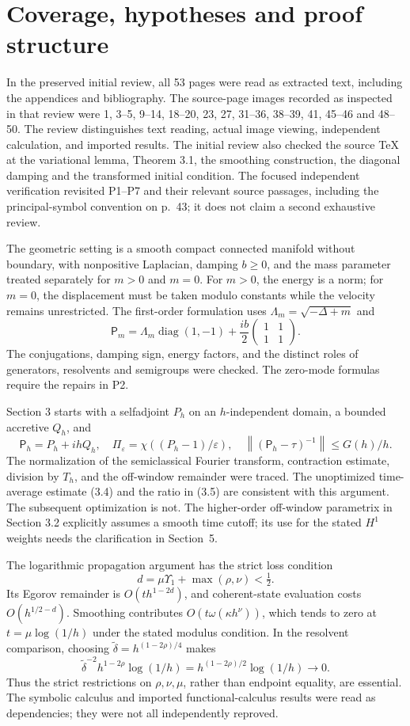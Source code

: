 \documentclass[10pt]{article}
\begin{document}
\section*{Coverage, hypotheses and proof structure}
In the preserved initial review, all 53 pages were read as extracted text, including the appendices and bibliography. The source-page images recorded as inspected in that review were 1, 3–5, 9–14, 18–20, 23, 27, 31–36, 38–39, 41, 45–46 and 48–50. The review distinguishes text reading, actual image viewing, independent calculation, and imported results. The initial review also checked the source TeX at the variational lemma, Theorem 3.1, the smoothing construction, the diagonal damping and the transformed initial condition. The focused independent verification revisited P1–P7 and their relevant source passages, including the principal-symbol convention on p. 43; it does not claim a second exhaustive review.\par
The geometric setting is a smooth compact connected manifold without boundary, with nonpositive Laplacian, damping \(b\geq0\), and the mass parameter treated separately for \(m>0\) and \(m=0\). For \(m>0\), the energy is a norm; for \(m=0\), the displacement must be taken modulo constants while the velocity remains unrestricted. The first-order formulation uses \(\Lambda_m=\sqrt{-\Delta+m}\) and \[\mathsf P_m=\Lambda_m\operatorname{diag}(1,-1)
       +\frac{ib}{2}\begin{pmatrix}1&1\\1&1\end{pmatrix}.\] The conjugations, damping sign, energy factors, and the distinct roles of generators, resolvents and semigroups were checked. The zero-mode formulas require the repairs in P2.\par
Section 3 starts with a selfadjoint \(P_h\) on an \(h\)-independent domain, a bounded accretive \(Q_h\), and \[\mathsf P_h=P_h+ihQ_h,\quad
 \Pi_\varepsilon=\chi((P_h-1)/\varepsilon),\quad
 \left\|(\mathsf P_h-\tau)^{-1}\right\|\leq G(h)/h.\] The normalization of the semiclassical Fourier transform, contraction estimate, division by \(T_h\), and the off-window remainder were traced. The unoptimized time-average estimate (3.4) and the ratio in (3.5) are consistent with this argument. The subsequent optimization is not. The higher-order off-window parametrix in Section 3.2 explicitly assumes a smooth time cutoff; its use for the stated \(H^1\) weights needs the clarification in Section 5.\par
The logarithmic propagation argument has the strict loss condition \[d=\mu\Upsilon_1+\max(\rho,\nu)<\tfrac12.\] Its Egorov remainder is \(O(th^{1-2d})\), and coherent-state evaluation costs \(O(h^{1/2-d})\). Smoothing contributes \(O(t\omega(\kappa h^\nu))\), which tends to zero at \(t=\mu\log(1/h)\) under the stated modulus condition. In the resolvent comparison, choosing \(\widetilde\delta=h^{(1-2\rho)/4}\) makes \[\widetilde\delta^{-2}h^{1-2\rho}\log(1/h)
 =h^{(1-2\rho)/2}\log(1/h)\longrightarrow0.\] Thus the strict restrictions on \(\rho,\nu,\mu\), rather than endpoint equality, are essential. The symbolic calculus and imported functional-calculus results were read as dependencies; they were not all independently reproved.\par
\end{document}
